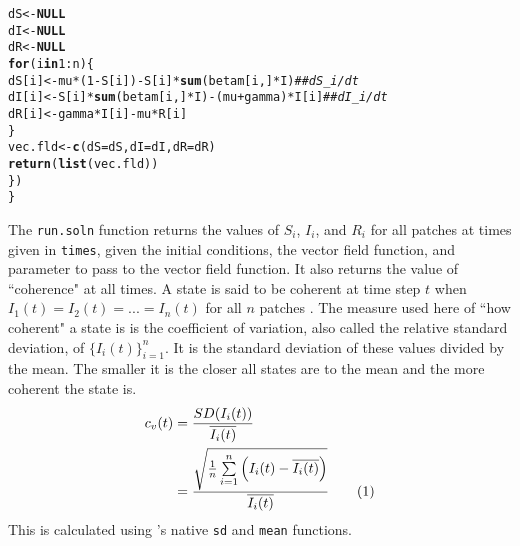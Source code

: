 \documentclass{article}\usepackage[]{graphicx}\usepackage[]{color}
\makeatletter
\newcommand{\hlnum}[1]{\textcolor[rgb]{0.686,0.059,0.569}{#1}}%
\newcommand{\hlcom}[1]{\textcolor[rgb]{0.678,0.584,0.686}{\textit{#1}}}%
\newcommand{\hlopt}[1]{\textcolor[rgb]{0,0,0}{#1}}%
\newcommand{\hlstd}[1]{\textcolor[rgb]{0.345,0.345,0.345}{#1}}%
\newcommand{\hlkwa}[1]{\textcolor[rgb]{0.161,0.373,0.58}{\textbf{#1}}}%
\newcommand{\hlkwb}[1]{\textcolor[rgb]{0.69,0.353,0.396}{#1}}%
\newcommand{\hlkwc}[1]{\textcolor[rgb]{0.333,0.667,0.333}{#1}}%
\newcommand{\hlkwd}[1]{\textcolor[rgb]{0.737,0.353,0.396}{\textbf{#1}}}%
\newenvironment{kframe}{%
 \def\at@end@of@kframe{}%
 \ifinner\ifhmode%
  \def\at@end@of@kframe{\end{minipage}}%
  \begin{minipage}{\columnwidth}%
 \fi\fi%
 \def\FrameCommand##1{\hskip\@totalleftmargin \hskip-\fboxsep
 \colorbox{shadecolor}{##1}\hskip-\fboxsep
     \hskip-\linewidth \hskip-\@totalleftmargin \hskip\columnwidth}%
 \MakeFramed {\advance\hsize-\width
   \@totalleftmargin\z@ \linewidth\hsize
   \@setminipage}}%
 {\par\unskip\endMakeFramed%
 \at@end@of@kframe}
\newenvironment{knitrout}{}{} %
\newcommand\numberthis{\addtocounter{equation}{1}\tag{\theequation}}
\makeatother
\begin{document}
\begin{knitrout}
\begin{kframe}
\begin{alltt}
    \hlstd{dS} \hlkwb{<-} \hlkwa{NULL}
    \hlstd{dI} \hlkwb{<-} \hlkwa{NULL}
    \hlstd{dR} \hlkwb{<-} \hlkwa{NULL}
    \hlkwa{for} \hlstd{(i} \hlkwa{in} \hlnum{1}\hlopt{:}\hlstd{n)\{}
      \hlstd{dS[i]} \hlkwb{<-} \hlstd{mu}\hlopt{*}\hlstd{(}\hlnum{1}\hlopt{-}\hlstd{S[i])} \hlopt{-} \hlstd{S[i]}\hlopt{*}\hlkwd{sum}\hlstd{(betam[i,]}\hlopt{*}\hlstd{I)} \hlcom{##dS_i/dt}
      \hlstd{dI[i]} \hlkwb{<-} \hlstd{S[i]}\hlopt{*}\hlkwd{sum}\hlstd{(betam[i,]}\hlopt{*}\hlstd{I)} \hlopt{-} \hlstd{(mu}\hlopt{+}\hlstd{gamma)}\hlopt{*}\hlstd{I[i]}  \hlcom{## dI_i/dt}
      \hlstd{dR[i]} \hlkwb{<-} \hlstd{gamma}\hlopt{*}\hlstd{I[i]} \hlopt{-}\hlstd{mu}\hlopt{*}\hlstd{R[i]}
    \hlstd{\}}
    \hlstd{vec.fld} \hlkwb{<-} \hlkwd{c}\hlstd{(}\hlkwc{dS}\hlstd{=dS,}\hlkwc{dI}\hlstd{=dI,}\hlkwc{dR}\hlstd{=dR)}
    \hlkwd{return}\hlstd{(}\hlkwd{list}\hlstd{(vec.fld))}
  \hlstd{\})}
\hlstd{\}}
\end{alltt}
\end{kframe}
\end{knitrout}
The \verb|run.soln| function returns the values of $S_i$, $I_i$, and $R_i$ for all patches at times given in \verb|times|, given the initial conditions, the vector field function, and parameter to pass to the vector field function. It also returns the value of ``coherence" at all times. A state is said to be coherent at time step $t$ when $I_1(t)=I_2(t)=...=I_n(t)$ for all $n$ patches \cite{McCluskey2011}. The measure used here of ``how coherent" a state is is the coefficient of variation, also called the relative standard deviation, of $\{I_i(t) \}_{i=1}^n$. It is the standard deviation of these values divided by the mean. The smaller it is the closer all states are to the mean and the more coherent the state is. 
\begin{align*}
  c_v(t) &= \frac{SD(I_i(t))}{\overline{I_i(t)}} \\
  &= \frac{\sqrt{\frac{1}{n}\sum\limits_{i=1}^{n}\left (I_i(t)-\overline{I_i(t)} \right ) } }{\overline{I_i(t)}} \numberthis
\end{align*}
This is calculated using \Rlogo's native \verb|sd| and \verb|mean| functions. 
\end{document}
